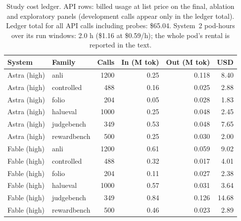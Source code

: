 \begin{table}[t]
\centering\small
\caption{Study cost ledger. API rows: billed usage at list price on the final, ablation and exploratory panels (development calls appear only in the ledger total). Ledger total for all API calls including probes: \$65.04. System~2 pod-hours over its run windows: 2.0 h (\$1.16 at \$0.59/h); the whole pod's rental is reported in the text.}
\label{tab:ledger}
\begin{tabular}{@{}llrrrr@{}}
\toprule
System & Family & Calls & In (M tok) & Out (M tok) & USD \\
\midrule
Astra (high) & anli & 1200 & 0.25 & 0.118 & 8.40 \\
Astra (high) & controlled & 488 & 0.16 & 0.025 & 2.88 \\
Astra (high) & folio & 204 & 0.05 & 0.028 & 1.83 \\
Astra (high) & halueval & 1000 & 0.25 & 0.048 & 2.45 \\
Astra (high) & judgebench & 349 & 0.53 & 0.048 & 7.65 \\
Astra (high) & rewardbench & 500 & 0.25 & 0.030 & 2.00 \\
Fable (high) & anli & 1200 & 0.61 & 0.059 & 9.02 \\
Fable (high) & controlled & 488 & 0.32 & 0.017 & 4.01 \\
Fable (high) & folio & 204 & 0.11 & 0.027 & 2.38 \\
Fable (high) & halueval & 1000 & 0.57 & 0.031 & 3.64 \\
Fable (high) & judgebench & 349 & 0.84 & 0.126 & 14.68 \\
Fable (high) & rewardbench & 500 & 0.46 & 0.023 & 2.89 \\
\bottomrule
\end{tabular}
\end{table}
